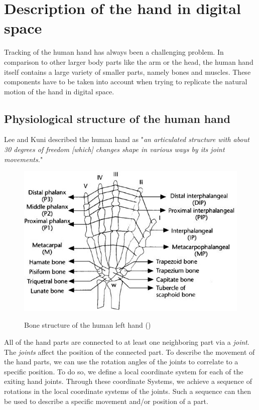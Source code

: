 
\chapter{Description of the hand in digital space}
\label{sec:Description_of_hand_in_digital_space}
Tracking of the human hand has always been a challenging problem. In comparison to other larger body parts like the arm or the head, the human hand itself contains a large variety of smaller parts, namely bones and muscles. These components have to be taken into account when trying to replicate the natural motion of the hand in digital space.
\section{Physiological structure of the human hand}
\label{sec:Physiological_structure_of_the_human_hand}
Lee and Kuni \citep{LEE.1995} described the human hand as "\textit{an articulated structure with about 30 degrees of freedom [which] changes shape in various ways by its joint movements.}"
\begin{figure}[H]
	\centering
	\includegraphics[width=\textwidth]{images/hand.jpg}
	\label{Handstructure} 
	\caption{Bone structure of the human left hand (\cite{LEE.1995})}
\end{figure}
All of the hand parts are connected to at least one neighboring part via a \textit{joint}. The \textit{joints} affect the position of the connected part. To describe the movement of the hand parts, we can use the rotation angles of the joints to correlate to a specific position.
To do so, we define a local coordinate system for each of the exiting hand joints. Through these coordinate Systems, we achieve a sequence of rotations in the local coordinate systems of the joints. Such a sequence can then be used to describe a specific movement and/or position of a part.
